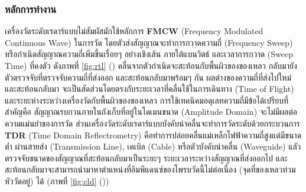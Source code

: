 \documentclass[final,11pt,a4paper]{article}
\begin{document}
\subsubsection{หลักการทำงาน} 
เครื่องวัดระดับเรดาร์แบบไม่สัมผัสมักใช้หลักการ \textbf{FMCW} (Frequency Modulated Continuous Wave) ในการวัด 
โดยตัวส่งสัญญาณจะทำการกวาดความถี่ (Frequency Sweep) หรือกำเนิดสัญญาณความถี่เพิ่มขึ้นเรื่อยๆ อย่างเชิงเส้น ภายใต้แบนวิตธ์ และเวลาการกวาด
(Sweep Time) ที่คงตัว ดังภาพที่ \ref{fig:rtl} () คลื่นจากตัวกำเนิดจะสะท้อนกับพื้นผิวของของเหลว กลับมายังตัวตรวจจับที่ตรวจจับความถี่ที่ส่งออก และสะท้อนกลับมาพร้อมๆ กัน
ผลต่างของความถี่ที่ส่งไปใหม่ และสะท้อนกลับมา จะเป็นสัดส่วนโดยตรงกับระยะเวลาที่คลื่นใช้ในการเดินทาง (Time of Flight) 
และระยะห่างระหว่างเครื่องวัดกับพื้นผิวของของเหลว การใช้เทคนิคมอดุเลทความถี่มีข้อได้เปรียบที่สำคัญคือ สัญญาณรบกวนภายในถังเก็บที่อยู่ในโดเมนขนาด 
(Amplitude Domain) จะไม่มีผลต่อความแม่นยำของการวัด ส่วนเครื่องวัดระดับเรดาร์แบบบังคับนำคลื่นจะทำการวัดระดับด้วยกระบวนการ \textbf{TDR} 
(Time Domain Reflectrometry) คือทำการปล่อยคลื่นแม่เหล็กไฟฟ้าความถี่สูงแต่มีขนาดต่ำ ผ่านสายส่ง (Transmission Line), เคเบิล (Cable) 
หรือตัวบังคับนำคลื่น (Waveguide) แลัวตรวจจับขนาดของสัญญาณที่สะท้อนกลับมาเป็นระยะๆ ระยะเวลาระหว่างสัญญาณที่ส่งออกไป 
และสะท้อนกลับมาจะสามารถนำมาหาตำแหน่งที่อิมพีแดนซ์ของโพรบวัดนี้ไม่ต่อเนื่อง (จุดที่ของเหลวท่วมหัววัดอยู่) ได้ (ภาพที่ \ref{fig:cld} ())
\end{document}

